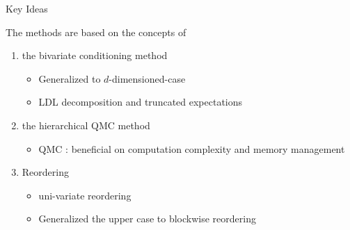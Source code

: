 \begin{frame}{Key Ideas}
    
    The methods are based on the concepts of 
        \begin{enumerate}
            \item the bivariate conditioning method \citep{trinh2015bivariate}
            \begin{itemize}
                \item Generalized to $d$-dimensioned-case
                \item LDL decomposition and truncated expectations
            \end{itemize}
            \item the hierarchical QMC method \citep{genton2018hierarchical}
            \begin{itemize}
                \item QMC : beneficial on computation complexity and memory management
            \end{itemize}
            \item Reordering \citep{trinh2015bivariate}
            \begin{itemize}
                \item uni-variate reordering \citep{trinh2015bivariate}
                \item Generalized the upper case to blockwise reordering
            \end{itemize}
        \end{enumerate} 
        
        
\end{frame}
